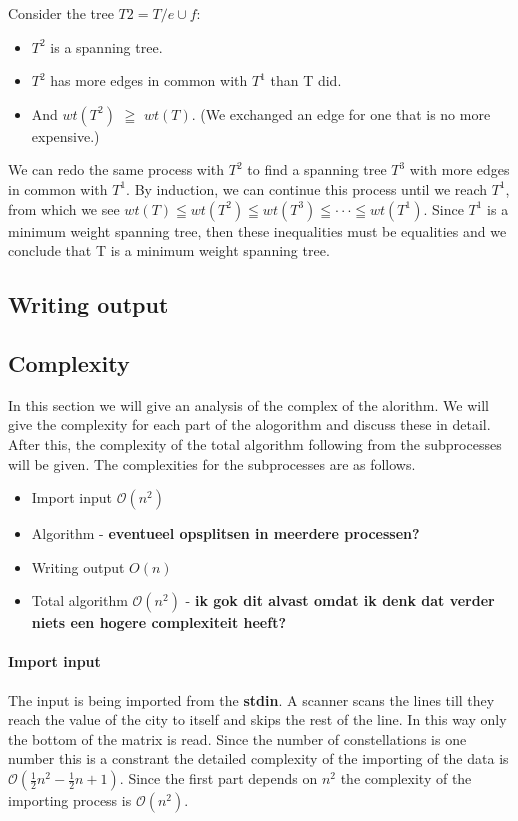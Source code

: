 \documentclass{article}
\newcommand{\bigO}[1]{\mathcal{O}(#1)}
\begin{document}
Consider the tree $T2 = T / {e}\cup{f}:$
\begin{itemize}
  \item $T^2$ is a spanning tree.
  \item $T^2$ has more edges in common with $T^1$ than T did.
  \item And $wt(T^2)$ $\geqq $ $wt(T)$. (We exchanged an edge for one that is no more expensive.)
\end{itemize}
We can redo the same process with $T^2$ to find a spanning tree $T^3$ with more edges in common with
$T^1$. By induction, we can continue this process until we reach $T^1$, from which we see
\newline
\newline
$wt (T) \leqq wt (T^2) \leqq wt (T^3) \leqq \cdot \cdot \cdot \leqq wt (T^1).$
\newline
\newline
Since $T^1$ is a minimum weight spanning tree, then these inequalities must be equalities and we
conclude that T is a minimum weight spanning tree.

\subsection{Writing output}

\subsection{Complexity}
In this section we will give an analysis of the complex of the alorithm. We will give the complexity for each part of the alogorithm and discuss these in detail. After this, the complexity of the total algorithm following from the subprocesses will be given. The complexities for the subprocesses are as follows.
\begin{itemize}
  \item Import input $\bigO{n^2}$
  \item Algorithm - \textbf{eventueel opsplitsen in meerdere processen?}
  \item Writing output $O(n)$
  \item Total algorithm $\bigO{n^2}$ - \textbf{ik gok dit alvast omdat ik denk dat verder niets een hogere complexiteit heeft?}
\end{itemize}

\paragraph{Import input}
The input is being imported from the \textbf{stdin}. A scanner scans the lines till they reach the value of the city to itself and skips the rest of the line. In this way only the bottom of the matrix is read. Since the number of constellations is one number this is a constrant the detailed complexity of the importing of the data is $\bigO{\frac{1}{2}n^2 - \frac{1}{2}n + 1}$. Since the first part depends on $n^2$ the complexity of the importing process is $\bigO{n^2}$.
\end{document}

